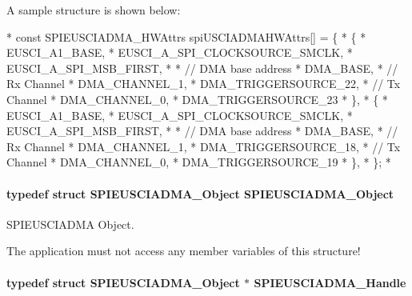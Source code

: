 A sample structure is shown below\-: 
\begin{DoxyCode}
*  \textcolor{keyword}{const} SPIEUSCIADMA_HWAttrs spiUSCIADMAHWAttrs[] = \{
*      \{
*          EUSCI\_A1\_BASE,
*          EUSCI\_A\_SPI\_CLOCKSOURCE\_SMCLK,
*          EUSCI\_A\_SPI\_MSB\_FIRST,
*
*          \textcolor{comment}{// DMA base address}
*          DMA\_BASE,
*          \textcolor{comment}{// Rx Channel}
*          DMA\_CHANNEL\_1,
*          DMA\_TRIGGERSOURCE\_22,
*          \textcolor{comment}{// Tx Channel}
*          DMA\_CHANNEL\_0,
*          DMA\_TRIGGERSOURCE\_23
*      \},
*      \{
*          EUSCI\_A1\_BASE,
*          EUSCI\_A\_SPI\_CLOCKSOURCE\_SMCLK,
*          EUSCI\_A\_SPI\_MSB\_FIRST,
*
*          \textcolor{comment}{// DMA base address}
*          DMA\_BASE,
*          \textcolor{comment}{// Rx Channel}
*          DMA\_CHANNEL\_1,
*          DMA\_TRIGGERSOURCE\_18,
*          \textcolor{comment}{// Tx Channel}
*          DMA\_CHANNEL\_0,
*          DMA\_TRIGGERSOURCE\_19
*      \},
*  \};
*  
\end{DoxyCode}
\paragraph[{S\-P\-I\-E\-U\-S\-C\-I\-A\-D\-M\-A\-\_\-\-Object}]{\setlength{\rightskip}{0pt plus 5cm}typedef struct {\bf S\-P\-I\-E\-U\-S\-C\-I\-A\-D\-M\-A\-\_\-\-Object}  {\bf S\-P\-I\-E\-U\-S\-C\-I\-A\-D\-M\-A\-\_\-\-Object}}\label{_s_p_i_e_u_s_c_i_a_d_m_a_8h_a4126d5130238bf5228a4b403e75108e7}


S\-P\-I\-E\-U\-S\-C\-I\-A\-D\-M\-A Object. 

The application must not access any member variables of this structure! 
\paragraph[{S\-P\-I\-E\-U\-S\-C\-I\-A\-D\-M\-A\-\_\-\-Handle}]{\setlength{\rightskip}{0pt plus 5cm}typedef struct {\bf S\-P\-I\-E\-U\-S\-C\-I\-A\-D\-M\-A\-\_\-\-Object} $\ast$ {\bf S\-P\-I\-E\-U\-S\-C\-I\-A\-D\-M\-A\-\_\-\-Handle}}\label{_s_p_i_e_u_s_c_i_a_d_m_a_8h_a16164ef02768c9a61448d6c0f4d27b29}


